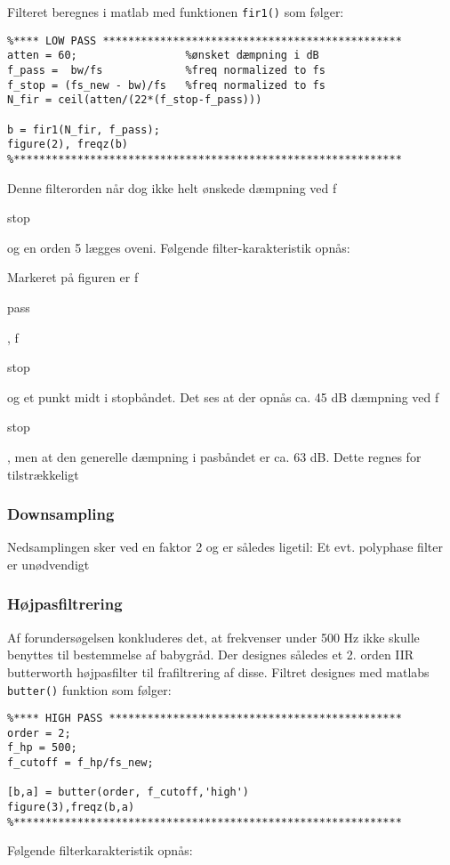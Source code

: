 Filteret beregnes i matlab med funktionen \verb+fir1()+ som følger:
\begin{verbatim}%**** LOW PASS ***********************************************
atten = 60;                 %ønsket dæmpning i dB
f_pass =  bw/fs             %freq normalized to fs
f_stop = (fs_new - bw)/fs   %freq normalized to fs
N_fir = ceil(atten/(22*(f_stop-f_pass)))

b = fir1(N_fir, f_pass);
figure(2), freqz(b)
%*************************************************************
\end{verbatim}

Denne filterorden når dog ikke helt ønskede dæmpning ved f\begin{tiny}stop\end{tiny} og en orden 5 lægges oveni. Følgende filter-karakteristik opnås:

Markeret på figuren er f\begin{tiny}pass\end{tiny}, f\begin{tiny}stop\end{tiny} og et punkt midt i stopbåndet. Det ses at der opnås ca. 45 dB dæmpning ved f\begin{tiny}stop\end{tiny}, men at den generelle dæmpning i pasbåndet er ca. 63 dB. Dette regnes for tilstrækkeligt

\subsubsection*{Downsampling} 
Nedsamplingen sker ved en faktor 2 og er således ligetil: Et evt. polyphase filter er unødvendigt

\subsubsection{Højpasfiltrering}
Af forundersøgelsen konkluderes det, at frekvenser under 500 Hz ikke skulle benyttes til bestemmelse af babygråd. Der designes således et 2. orden IIR butterworth højpasfilter til frafiltrering af disse. Filtret designes med matlabs \verb+butter()+ funktion som følger:
\begin{verbatim}%**** HIGH PASS **********************************************
order = 2;
f_hp = 500;
f_cutoff = f_hp/fs_new;

[b,a] = butter(order, f_cutoff,'high')
figure(3),freqz(b,a)
%*************************************************************
\end{verbatim}
Følgende filterkarakteristik opnås:

